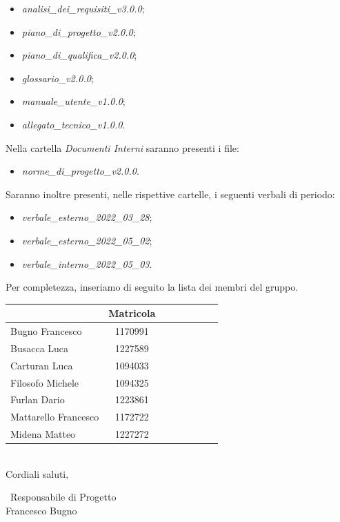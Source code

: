 \documentclass[a4paper, 10pt]{article}
\begin{document}
\begin{itemize}
    \item \textit{analisi\_dei\_requisiti\_v3.0.0};
    \item \textit{piano\_di\_progetto\_v2.0.0};
    \item \textit{piano\_di\_qualifica\_v2.0.0};
    \item \textit{glossario\_v2.0.0};
    \item \textit{manuale\_utente\_v1.0.0};
    \item \textit{allegato\_tecnico\_v1.0.0}.
\end{itemize}
Nella cartella \textit{Documenti Interni} saranno presenti i file:
\begin{itemize}
    \item \textit{norme\_di\_progetto\_v2.0.0}.
\end{itemize}
Saranno inoltre presenti, nelle rispettive cartelle, i seguenti verbali di periodo:
\begin{itemize}
    \item \textit{verbale\_esterno\_2022\_03\_28};
    \item \textit{verbale\_esterno\_2022\_05\_02};
    \item \textit{verbale\_interno\_2022\_05\_03}.
\end{itemize}
Per completezza, inseriamo di seguito la lista dei membri del gruppo.
\begin{table}[H]
    \centering
    \renewcommand{\arraystretch}{1.8}
    \begin{tabular}{l|cccccc|c}
      \rowcolor[HTML]{125E28} 
      \multicolumn{1}{c}{\color[HTML]{FFFFFF}\textbf{Nome}} 
      & \color[HTML]{FFFFFF}\textbf{Matricola}\\
      \hline
      Bugno Francesco & 1170991\\
      Busacca Luca & 1227589\\
      Carturan Luca & 1094033\\
      Filosofo Michele & 1094325\\
      Furlan Dario & 1223861\\
      Mattarello Francesco & 1172722\\
      Midena Matteo & 1227272\\
      \hline             
    \end{tabular}
  \end{table}
\textbf{}\\
Cordiali saluti,\\
\begin{flushright}
    \
    Responsabile di Progetto\\
    Francesco Bugno \hspace{1.1cm}\hspace{1cm}
\end{flushright}
\end{document}
